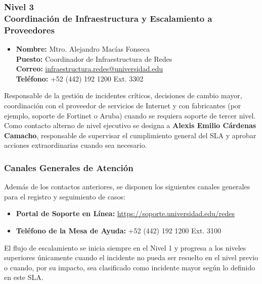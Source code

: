 \subsubsection*{Nivel 3 \\ Coordinación de Infraestructura y Escalamiento a Proveedores}
\begin{itemize}
	\item \textbf{Nombre:} Mtro. Alejandro Macías Fonseca\\
    	\textbf{Puesto:} Coordinador de Infraestructura de Redes\\
    	\textbf{Correo:} \href{mailto:infraestructura.redes@universidad.edu}{infraestructura.redes@universidad.edu}\\
    	\textbf{Teléfono:} +52 (442) 192 1200 Ext. 3302
\end{itemize}

Responsable de la gestión de incidentes críticos, decisiones de cambio mayor, coordinación con el proveedor de servicios de Internet y con fabricantes (por ejemplo, soporte de Fortinet o Aruba) cuando se requiera soporte de tercer nivel.\\[0.5em]

Como contacto alterno de nivel ejecutivo se designa a \textbf{Alexis Emilio Cárdenas Camacho}, responsable de supervisar el cumplimiento general del SLA y aprobar acciones extraordinarias cuando sea necesario.

\subsubsection*{Canales Generales de Atención}
Además de los contactos anteriores, se disponen los siguientes canales generales para el registro y seguimiento de casos:
\begin{itemize}
    \item \textbf{Portal de Soporte en Línea:} \url{https://soporte.universidad.edu/redes}
    \item \textbf{Teléfono de la Mesa de Ayuda:} +52 (442) 192 1200 Ext. 3100
\end{itemize}

El flujo de escalamiento se inicia siempre en el Nivel 1 y progresa a los niveles superiores únicamente cuando el incidente no pueda ser resuelto en el nivel previo o cuando, por su impacto, sea clasificado como incidente mayor según lo definido en este SLA.

